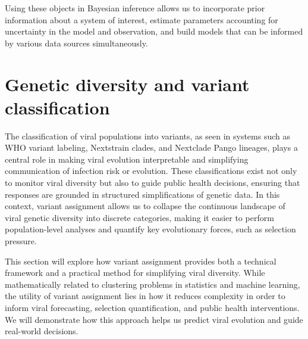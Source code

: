 

Using these objects in Bayesian inference allows us to incorporate prior information about a system of interest, estimate parameters accounting for uncertainty in the model and observation, and build models that can be informed by various data sources simultaneously. 

\section{Genetic diversity and variant classification}

The classification of viral populations into variants, as seen in systems such as WHO variant labeling, Nextstrain clades, and Nextclade Pango lineages, plays a central role in making viral evolution interpretable and simplifying communication of infection risk or evolution. 
These classifications exist not only to monitor viral diversity but also to guide public health decisions, ensuring that responses are grounded in structured simplifications of genetic data.
In this context, variant assignment allows us to collapse the continuous landscape of viral genetic diversity into discrete categories, making it easier to perform population-level analyses and quantify key evolutionary forces, such as selection pressure.

This section will explore how variant assignment provides both a technical framework and a practical method for simplifying viral diversity.
While mathematically related to clustering problems in statistics and machine learning, the utility of variant assignment lies in how it reduces complexity in order to inform viral forecasting, selection quantification, and public health interventions.
We will demonstrate how this approach helps us predict viral evolution and guide real-world decisions.

